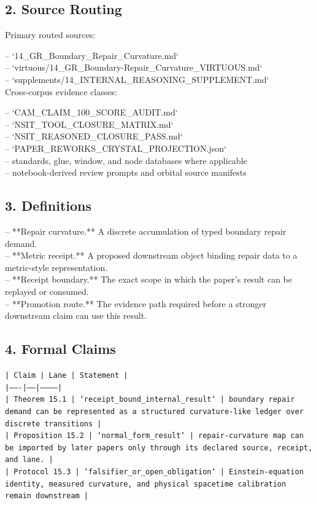 \documentclass[11pt]{article}
\begin{document}
\subsection*{2. Source Routing}

Primary routed sources:

\noindent{}-- `14\_GR\_Boundary\_Repair\_Curvature.md`\\
\noindent{}-- `virtuous/14\_GR\_Boundary-Repair\_Curvature\_VIRTUOUS.md`\\
\noindent{}-- `supplements/14\_INTERNAL\_REASONING\_SUPPLEMENT.md`\\

Cross-corpus evidence classes:

\noindent{}-- `CAM\_CLAIM\_100\_SCORE\_AUDIT.md`\\
\noindent{}-- `NSIT\_TOOL\_CLOSURE\_MATRIX.md`\\
\noindent{}-- `NSIT\_REASONED\_CLOSURE\_PASS.md`\\
\noindent{}-- `PAPER\_REWORKS\_CRYSTAL\_PROJECTION.json`\\
\noindent{}-- standards, glue, window, and node databases where applicable\\
\noindent{}-- notebook-derived review prompts and orbital source manifests\\

\subsection*{3. Definitions}

\noindent{}-- **Repair curvature.** A discrete accumulation of typed boundary repair demand.\\
\noindent{}-- **Metric receipt.** A proposed downstream object binding repair data to a metric-style representation.\\
\noindent{}-- **Receipt boundary.** The exact scope in which the paper's result can be replayed or consumed.\\
\noindent{}-- **Promotion route.** The evidence path required before a stronger downstream claim can use this result.\\

\subsection*{4. Formal Claims}

\noindent\texttt{| Claim | Lane | Statement |}\\
\noindent\texttt{|-------|------|-----------|}\\
\noindent\texttt{| Theorem 15.1 | `receipt\_bound\_internal\_result` | boundary repair demand can be represented as a structured curvature-like ledger over discrete transitions |}\\
\noindent\texttt{| Proposition 15.2 | `normal\_form\_result` | repair-curvature map can be imported by later papers only through its declared source, receipt, and lane. |}\\
\noindent\texttt{| Protocol 15.3 | `falsifier\_or\_open\_obligation` | Einstein-equation identity, measured curvature, and physical spacetime calibration remain downstream |}\\
\end{document}
